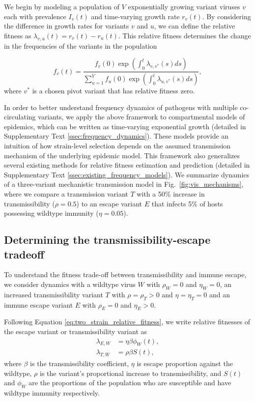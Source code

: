 \documentclass[11pt,oneside,letterpaper]{article}
\newcommand{\wt}{W}
\newcommand{\varE}{E}
\newcommand{\varT}{T}
\newcommand{\varEscape}{\eta}
\newcommand{\varTransmission}{\rho}
\begin{document}
We begin by modeling a population of $V$ exponentially growing variant viruses $v$ each with prevalence $I_v(t)$ and time-varying growth rate $r_v(t)$.
By considering the difference in growth rates for variants $v$ and $u$, we can define the relative fitness as $\lambda_{v, u}(t) = r_v(t) - r_u(t)$.
This relative fitness determines the change in the frequencies of the variants in the population

\begin{equation}
    f_v(t) = \frac{f_v(0) \exp \left( \int_0^t \lambda_{v, v^*}(s)ds \right)}{ \sum_{u=1}^{V} f_u(0) \exp \left( \int_0^t \lambda_{u, v^*}(s)ds \right)},
\end{equation}
where $v^*$ is a chosen pivot variant that has relative fitness zero.

In order to better understand frequency dynamics of pathogens with multiple co-circulating variants, we apply the above framework to compartmental models of epidemics, which can be written as time-varying exponential growth (detailed in Supplementary Text \ref{ssec:frequency_dynamics}).
These models provide an intuition of how strain-level selection depends on the assumed transmission mechanism of the underlying epidemic model.
This framework also generalizes several existing methods for relative fitness estimation and prediction (detailed in Supplementary Text \ref{ssec:existing_frequency_models}).
We summarize dynamics of a three-variant mechanistic transmission model in Fig.~\ref{fig:vis_mechanisms}, where we compare a transmission variant $T$ with a 50\% increase in transmissibility ($\varTransmission=0.5$) to an escape variant $E$ that infects 5\% of hosts possessing wildtype immunity ($\varEscape=0.05$).

\subsection*{Determining the transmissibility-escape tradeoff}

To understand the fitness trade-off between transmissibility and immune escape, we consider dynamics with a wildtype virus $\wt$ with $\varTransmission_\wt = 0$ and $\varEscape_\wt = 0$, an increased transmissibility variant $\varT$ with $\varTransmission = \varTransmission_\varT > 0$ and $\varEscape = \varEscape_\varT = 0$ and an immune escape variant $\varE$ with $\varTransmission_\varE = 0$ and $\varEscape_\varE > 0$.

Following Equation \ref{eq:two_strain_relative_fitness}, we write relative fitnesses of the escape variant or transmissibility variant as
\begin{align}
    \lambda_{\varE, \wt} &= \varEscape \beta \phi_{\wt}(t),\\
    \lambda_{\varT, \wt} &= \varTransmission \beta S(t),
\end{align}
where $\beta$ is the transmissibility coefficient, $\varEscape$ is escape proportion against the wildtype, $\varTransmission$ is the variant's proportional increase to transmissibility, and $S(t)$ and $\phi_{\wt}$ are the proportions of the population who are susceptible and have wildtype immunity respectively.
\end{document}
